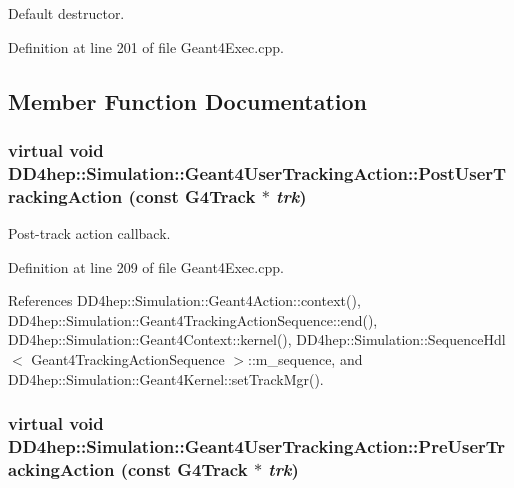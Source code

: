 Default destructor. 

Definition at line 201 of file Geant4Exec.cpp.

\subsection{Member Function Documentation}
\hypertarget{class_d_d4hep_1_1_simulation_1_1_geant4_user_tracking_action_ab5aeccf26ec4213e75bbdf6927bc7ee6}{
\subsubsection[{PostUserTrackingAction}]{\setlength{\rightskip}{0pt plus 5cm}virtual void DD4hep::Simulation::Geant4UserTrackingAction::PostUserTrackingAction (const G4Track $\ast$ {\em trk})}}
\label{class_d_d4hep_1_1_simulation_1_1_geant4_user_tracking_action_ab5aeccf26ec4213e75bbdf6927bc7ee6}


Post-\/track action callback. 

Definition at line 209 of file Geant4Exec.cpp.

References DD4hep::Simulation::Geant4Action::context(), DD4hep::Simulation::Geant4TrackingActionSequence::end(), DD4hep::Simulation::Geant4Context::kernel(), DD4hep::Simulation::SequenceHdl$<$ Geant4TrackingActionSequence $>$::m\_\-sequence, and DD4hep::Simulation::Geant4Kernel::setTrackMgr().\hypertarget{class_d_d4hep_1_1_simulation_1_1_geant4_user_tracking_action_a3c44bbbed885071eb14c08274e1b32a2}{
\subsubsection[{PreUserTrackingAction}]{\setlength{\rightskip}{0pt plus 5cm}virtual void DD4hep::Simulation::Geant4UserTrackingAction::PreUserTrackingAction (const G4Track $\ast$ {\em trk})}}
\label{class_d_d4hep_1_1_simulation_1_1_geant4_user_tracking_action_a3c44bbbed885071eb14c08274e1b32a2}


